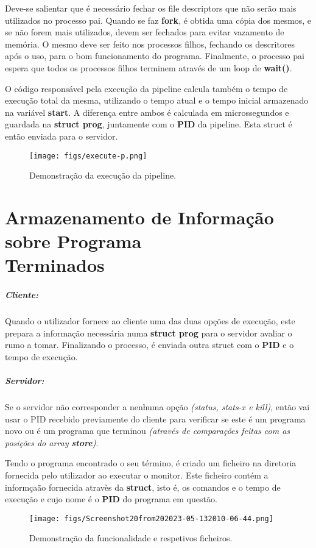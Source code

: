 \documentclass[11.5pt,a4paper]{report}
\begin{document}
Deve-se salientar que é necessário fechar os file descriptors que não serão mais utilizados no processo pai. Quando se faz \textbf{fork}, é obtida uma cópia dos mesmos, e se não forem mais utilizados, devem ser fechados para evitar vazamento de memória. O mesmo deve ser feito nos processos filhos, fechando os descritores após o uso, para o bom funcionamento do programa.
Finalmente, o processo pai espera que todos os processos filhos terminem através de um loop de \textbf{wait()}.\par
O código responsável pela execução da pipeline calcula também o tempo de execução total da mesma, utilizando o tempo atual e o tempo inicial armazenado na variável \textbf{start}. A diferença entre ambos é calculada em microssegundos e guardada na \textbf{struct prog}, juntamente com o \textbf{PID} da pipeline. Esta struct é então enviada para o servidor.

\begin{figure}[h]
    \centering
    \texttt{[image: figs/execute-p.png]}
    \caption{Demonstração da execução da pipeline.}
    \label{f}
\end{figure}

\section{Armazenamento de Informação sobre Programa\\Terminados}

\subparagraph{Cliente:} Quando o utilizador fornece ao cliente uma das duas opções de execução, este prepara a informação necessária numa \textbf{struct prog} para o servidor avaliar o rumo a tomar. Finalizando o processo, é enviada outra struct com o \textbf{PID} e o tempo de execução.

\subparagraph{Servidor:} Se o servidor não corresponder a nenhuma opção \textit{(status, stats-x e kill)}, então vai usar o PID recebido previamente do cliente para verificar se este é um programa novo ou é um programa que terminou \textit{(através de comparações feitas com as posições do array \textbf{store})}.\par
Tendo o programa encontrado o seu término, é criado um ficheiro na diretoria fornecida pelo utilizador ao executar o monitor. Este ficheiro contém a informçaão fornecida atravès da \textbf{struct}, isto é, os comandos e o tempo de execução e cujo nome é o \textbf{PID} do programa em questão.

\begin{figure}[h]
    \centering
    \texttt{[image: figs/Screenshot20from202023-05-132010-06-44.png]}
    \caption{Demonstração da funcionalidade e respetivos ficheiros.}
    \label{f}
\end{figure}
\end{document}
